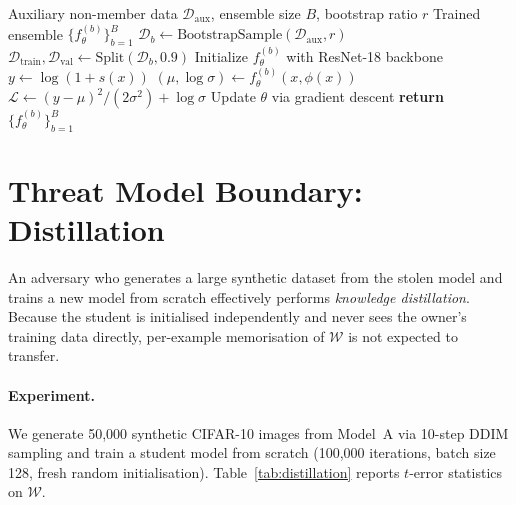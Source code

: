 \documentclass{article}
\begin{document}
\begin{algorithm}[!htbp]
\caption{Gaussian Quantile Regression Training}
\label{alg:gaussian_qr}
\begin{algorithmic}
\REQUIRE Auxiliary non-member data $\mathcal{D}_{\text{aux}}$, ensemble size $B$, bootstrap ratio $r$
\ENSURE Trained ensemble $\{f_{\theta}^{(b)}\}_{b=1}^{B}$
    \STATE $\mathcal{D}_b \leftarrow \text{BootstrapSample}(\mathcal{D}_{\text{aux}}, r)$ 
    \STATE $\mathcal{D}_{\text{train}}, \mathcal{D}_{\text{val}} \leftarrow \text{Split}(\mathcal{D}_b, 0.9)$
    \STATE Initialize $f_{\theta}^{(b)}$ with ResNet-18 backbone
    \REPEAT
            \STATE $y \leftarrow \log(1 + s(x))$
            \STATE $(\mu, \log\sigma) \leftarrow f_{\theta}^{(b)}(x, \phi(x))$
            \STATE $\mathcal{L} \leftarrow (y - \mu)^2 / (2\sigma^2) + \log\sigma$
            \STATE Update $\theta$ via gradient descent
        \ENDFOR
\ENDFOR
\STATE \textbf{return} $\{f_{\theta}^{(b)}\}_{b=1}^{B}$
\end{algorithmic}
\end{algorithm}


\section{Threat Model Boundary: Distillation}
\label{app:distillation}

An adversary who generates a large synthetic dataset from the stolen
model and trains a new model from scratch effectively performs
\emph{knowledge distillation}.  Because the student is initialised
independently and never sees the owner's training data directly,
per-example memorisation of $\mathcal{W}$ is not expected to transfer.

\paragraph{Experiment.}
We generate 50{,}000 synthetic CIFAR-10 images from Model~A via
10-step DDIM sampling and train a student model from scratch
(100{,}000 iterations, batch size 128, fresh random initialisation).
Table~\ref{tab:distillation} reports $t$-error statistics on $\mathcal{W}$.
\end{document}
